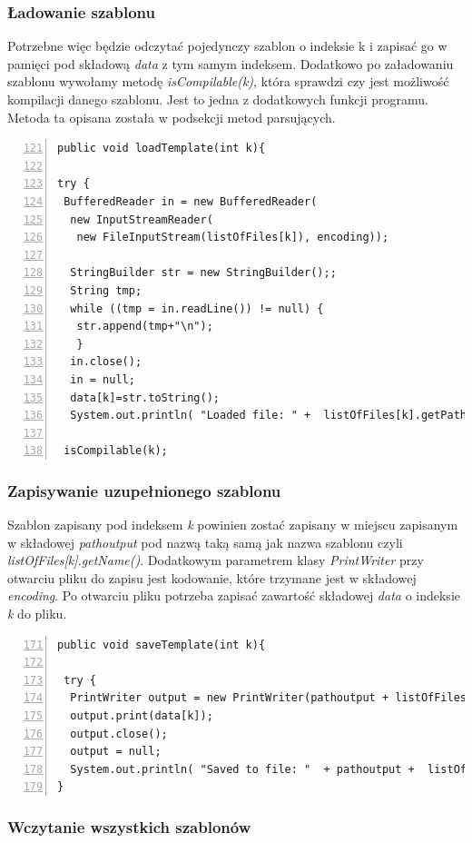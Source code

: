 \subsubsection*{Ładowanie szablonu}
Potrzebne więc będzie odczytać pojedynczy szablon o indeksie k i zapisać go w pamięci pod składową \emph{data} z tym samym indeksem. 
Dodatkowo po załadowaniu szablonu wywołamy metodę  \emph{isCompilable(k)}, która sprawdzi czy jest możliwość kompilacji danego szablonu. Jest to jedna z dodatkowych funkcji programu. Metoda ta opisana została w podsekcji metod parsujących. 
 \begin{lstlisting}[numbers=left,firstnumber=121]
public void loadTemplate(int k){
       
try {
 BufferedReader in = new BufferedReader(
  new InputStreamReader(
   new FileInputStream(listOfFiles[k]), encoding));
 
  StringBuilder str = new StringBuilder();;
  String tmp;
  while ((tmp = in.readLine()) != null) {
   str.append(tmp+"\n");
   }
  in.close();
  in = null;
  data[k]=str.toString();
  System.out.println( "Loaded file: " +  listOfFiles[k].getPath());
  
 isCompilable(k);
\end{lstlisting}

\subsubsection*{Zapisywanie uzupełnionego szablonu}

Szablon zapisany pod indeksem \emph{k} powinien zostać zapisany w miejscu zapisanym w składowej \emph{pathoutput} pod nazwą taką samą jak nazwa szablonu czyli \emph{listOfFiles[k].getName()}. Dodatkowym parametrem klasy \emph{PrintWriter} przy otwarciu pliku do zapisu jest kodowanie, które trzymane jest w składowej \emph{encoding}. Po otwarciu pliku potrzeba zapisać zawartość składowej \emph{data} o indeksie \emph{k} do pliku.

 \begin{lstlisting}[numbers=left,firstnumber=171]
public void saveTemplate(int k){
      
 try {
  PrintWriter output = new PrintWriter(pathoutput + listOfFiles[k].getName(),encoding);
  output.print(data[k]);
  output.close();
  output = null;
  System.out.println( "Saved to file: "  + pathoutput +  listOfFiles[k].getName() );
}
\end{lstlisting}

\subsubsection*{Wczytanie wszystkich szablonów}

